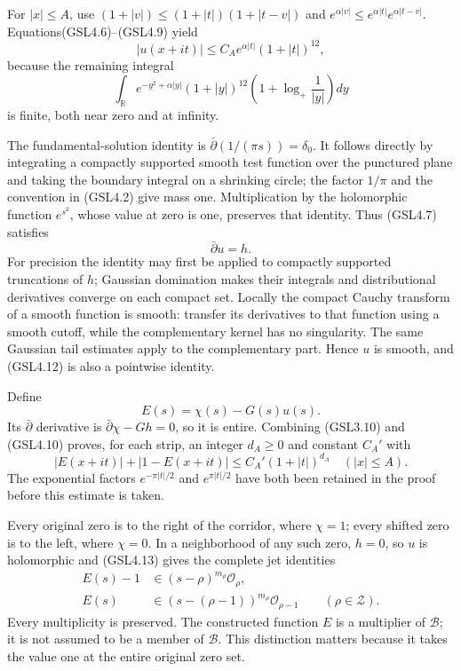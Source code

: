 For \(|x|\le A\), use \((1+|v|)\le(1+|t|)(1+|t-v|)\) and
\(e^{\alpha|v|}\le e^{\alpha|t|}e^{\alpha|t-v|}\).
Equations(GSL4.6)--(GSL4.9) yield \[
|u(x+it)|\le C_A e^{\alpha|t|}(1+|t|)^{12},
\tag{GSL4.10}
\] because the remaining integral \[
\int_{\mathbb R}e^{-y^2+\alpha|y|}(1+|y|)^{12}
 \left(1+\log_+\frac1{|y|}\right)dy
\tag{GSL4.11}
\] is finite, both near zero and at infinity.

The fundamental-solution identity is
\(\bar\partial(1/(\pi s))=\delta_0\). It follows directly by integrating
a compactly supported smooth test function over the punctured plane and
taking the boundary integral on a shrinking circle; the factor \(1/\pi\)
and the convention in (GSL4.2) give mass one. Multiplication by the
holomorphic function \(e^{s^2}\), whose value at zero is one, preserves
that identity. Thus (GSL4.7) satisfies \[
\bar\partial u=h.
\tag{GSL4.12}
\] For precision the identity may first be applied to compactly
supported truncations of \(h\); Gaussian domination makes their
integrals and distributional derivatives converge on each compact set.
Locally the compact Cauchy transform of a smooth function is smooth:
transfer its derivatives to that function using a smooth cutoff, while
the complementary kernel has no singularity. The same Gaussian tail
estimates apply to the complementary part. Hence \(u\) is smooth, and
(GSL4.12) is also a pointwise identity.

Define \[
E(s)=\chi(s)-G(s)u(s).
\tag{GSL4.13}
\] Its \(\bar\partial\) derivative is \(\bar\partial\chi-Gh=0\), so it
is entire. Combining (GSL3.10) and (GSL4.10) proves, for each strip, an
integer \(d_A\ge0\) and constant \(C_A'\) with \[
|E(x+it)|+|1-E(x+it)|
 \le C_A'(1+|t|)^{d_A}\quad(|x|\le A).
\tag{GSL4.14}
\] The exponential factors \(e^{-\pi|t|/2}\) and \(e^{\pi|t|/2}\) have
both been retained in the proof before this estimate is taken.

Every original zero is to the right of the corridor, where \(\chi=1\);
every shifted zero is to the left, where \(\chi=0\). In a neighborhood
of any such zero, \(h=0\), so \(u\) is holomorphic and (GSL4.13) gives
the complete jet identities \[
\begin{aligned}
E(s)-1&\in(s-\rho)^{m_\rho}\mathcal O_\rho,\\
E(s)&\in(s-(\rho-1))^{m_\rho}\mathcal O_{\rho-1}
\qquad(\rho\in\mathscr Z).
\end{aligned}
\tag{GSL4.15}
\] Every multiplicity is preserved. The constructed function \(E\) is a
multiplier of \(\mathcal B\); it is not assumed to be a member of
\(\mathcal B\). This distinction matters because it takes the value one
at the entire original zero set.

